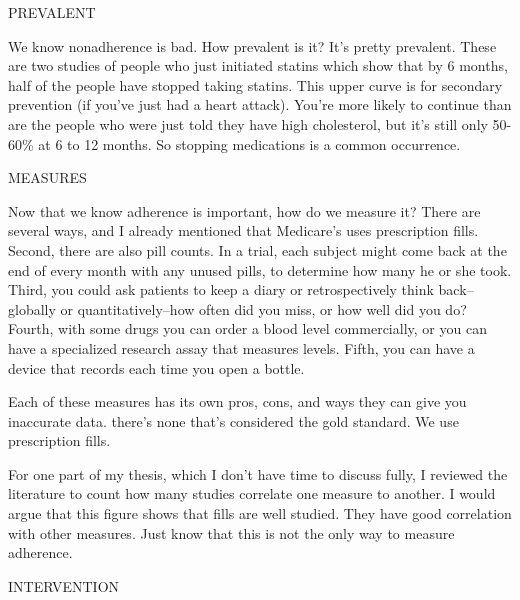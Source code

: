 \documentclass[12pt]{report}
\begin{document}
\begin{large}
PREVALENT

We know nonadherence is bad. How prevalent is it? It's pretty
prevalent. These are two studies of people who just initiated statins
which show that by 6 months, half of the people have stopped taking
statins. This upper curve is for secondary prevention (if you've just
had a heart attack). You're more likely to continue than are the
people who were just told they have high cholesterol, but it's still
only 50-60\% at 6 to 12 months. So stopping medications is a common
occurrence.

MEASURES

Now that we know adherence is important, how do we measure it? There
are several ways, and I already mentioned that Medicare's uses
prescription fills. Second, there are also pill counts. In a trial,
each subject might come back at the end of every month with any unused
pills, to determine how many he or she took. Third, you could ask
patients to keep a diary or retrospectively think back--globally or
quantitatively--how often did you miss, or how well did you do?
Fourth, with some drugs you can order a blood level commercially, or
you can have a specialized research assay that measures levels. Fifth,
you can have a device that records each time you open a
bottle. 

Each of these measures has its own pros, cons, and ways they can give
you inaccurate data. there's none that's considered the gold standard.
We use prescription fills. 

For one part of my thesis, which I don't have time to discuss fully, I
reviewed the literature to count how many studies correlate one
measure to another. I would argue that this figure shows that fills
are well studied. They have good correlation with other measures. Just
know that this is not the only way to measure adherence. 

INTERVENTION


\end{large}
\end{document}
